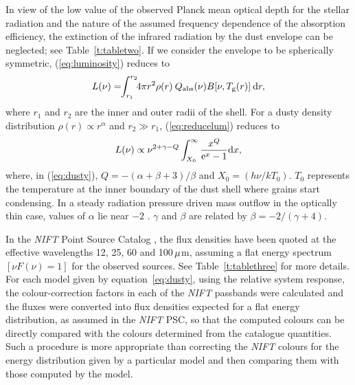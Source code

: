 \documentclass[useAMS,usenatbib, referree]{biom}
\begin{document}
In view of the low value of the observed Planck mean  optical depth for
the stellar radiation and the nature of the assumed frequency
dependence of the absorption efficiency, the extinction of the infrared
radiation by the dust envelope can be neglected; see Table~\ref{t:tabletwo}. If we consider the
envelope to be spherically symmetric, (\ref{eq:luminosity}) reduces to
\begin{equation}
   L(\nu)=\!\!\int_{r_{1}}^{r_{2}}\!\!4\upi r^2\rho(r)\> Q_{\rmn{abs}}(\nu)B[\nu,T_{\rmn{g}}(r)]\> {\rmn{d}}r,
\label{eq:reducelum}
\end{equation}
where $r_1$ and $r_2$ are the inner and
outer radii of the shell. For a dusty density distribution
$\rho(r)\propto r^{\alpha}$ and $r_2\gg r_1$, (\ref{eq:reducelum}) reduces to
\begin{equation}
   L(\nu)\propto \nu^{2+\gamma-Q}\int_{X_0}^{\infty}{{x^Q}\over
   {\rmn{e}^x-1}}\rmn{d}x ,
\label{eq:dusty}
\end{equation}
where, in (\ref{eq:dusty}), $Q=-(\alpha+\beta+3)/\beta$ and $X_0=(h\nu
/kT_0)$. $T_0$ represents the temperature at the inner boundary of the
dust shell where grains start condensing. In a steady radiation
pressure driven mass outflow in the optically thin case, values of
$\alpha$ lie near $-2$ \citep{b8}. $\gamma$ and $\beta$ are related by
$\beta=-2/(\gamma+4)$.


In the {\it NIFT\/} Point Source Catalog \citep[PSC;][]{b2}, the flux
densities have been quoted at the effective wavelengths 12, 25, 60 and
\hbox{100\,$\mu$m}, assuming a flat energy spectrum $[\nu F(\nu)=1]$
for the observed sources. See Table~\ref{t:tablethree} for more
details. For each model given by equation~\ref{eq:dusty}, using the relative
system response, the colour-correction factors in each of the {\it
NIFT\/} passbands were calculated and the fluxes were converted into
flux densities expected for a flat energy distribution, as assumed in
the {\it NIFT\/} PSC, so that the computed colours can be directly
compared with the colours determined from the catalogue
quantities. Such a procedure is more appropriate than correcting the
{\it NIFT\/} colours for the energy distribution given by a particular
model and then comparing them with those computed by the model.\vspace*{-6pt}
\end{document}
